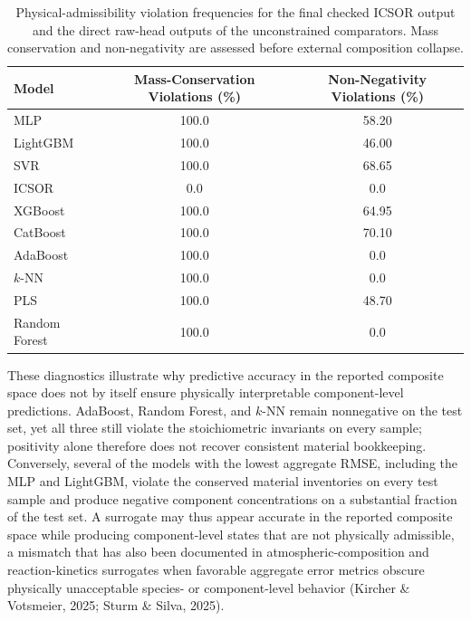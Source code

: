 \documentclass[a4paper,fleqn]{cas-sc}
\DeclareRobustCommand{\currentrev}[1]{{\color{currentRevisionBlue}#1}}
\DeclareRobustCommand{\currentrev}[1]{#1}
\newenvironment{revblock}{}{}
\newenvironment{revblockr22}{}{}
\begin{document}
\begin{revblock}
\begin{revblockr22}
\begin{table}[htbp]
\centering
\caption{\currentrev{Physical-admissibility violation frequencies for the final checked ICSOR output and the direct raw-head outputs of the unconstrained comparators. Mass conservation and non-negativity are assessed before external composition collapse.}}
\label{tab:results_physical_sample}
\scriptsize
\begin{tabular}{lcc}
\hline
Model & Mass-Conservation Violations (\%) & Non-Negativity Violations (\%) \\
\hline
MLP & 100.0 & 58.20 \\
LightGBM & 100.0 & 46.00 \\
SVR & 100.0 & 68.65 \\
ICSOR & 0.0 & 0.0 \\
XGBoost & 100.0 & 64.95 \\
CatBoost & 100.0 & 70.10 \\
AdaBoost & 100.0 & 0.0 \\
$k$-NN & 100.0 & 0.0 \\
PLS & 100.0 & 48.70 \\
Random Forest & 100.0 & 0.0 \\
\hline
\end{tabular}
\end{table}

These diagnostics illustrate why predictive accuracy in the reported composite space does not by itself ensure physically interpretable component-level predictions. AdaBoost, Random Forest, and $k$-NN remain nonnegative on the test set, yet all three still violate the stoichiometric invariants on every sample; positivity alone therefore does not recover consistent material bookkeeping. Conversely, several of the models with the lowest aggregate RMSE, including the MLP and LightGBM, violate the conserved material inventories on every test sample and produce negative component concentrations on a substantial fraction of the test set. A surrogate may thus appear accurate in the reported composite space while producing component-level states that are not physically admissible, a mismatch that has also been documented in atmospheric-composition and reaction-kinetics surrogates when favorable aggregate error metrics obscure physically unacceptable species- or component-level behavior (Kircher \& Votsmeier, 2025; Sturm \& Silva, 2025).


\end{revblockr22}
\end{revblock}
\end{document}
